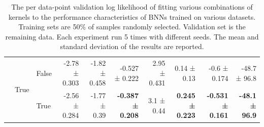 {\begin{landscape}
\begin{table}
\begin{tabular}{lll|rrrrrrr}
				\cline{2-10}
				& \multirow{2}{*}{True} & False &            -2.78 ± 0.303 &  -1.82 ± 0.458 &  -0.527 ± 0.222 &  2.95 ± 0.431 &     0.14 ± 0.13 &     -0.6 ± 0.174 &  -48.7 ± 96.8 \\
				&       & True  &            -2.56 ± 0.284 &   -1.77 ± 0.39 &  \textbf{-0.387 ± 0.208} &    3.1 ± 0.44 &   \textbf{0.245 ± 0.223} &   \textbf{-0.531 ± 0.161} &  \textbf{-48.1 ± 96.9} \\
				\bottomrule
			\end{tabular}
			\caption{The per data-point validation log likelihood of fitting various combinations of kernels to the performance characteristics of BNNs trained on various datasets. Training sets are 50\% of samples randomly selected. Validation set is the remaining data. Each experiment run 5 times with different seeds. The mean and standard deviation of the results are reported.}
			\label{tbl:kernel_half}
		\end{table}
		

\end{landscape}}
